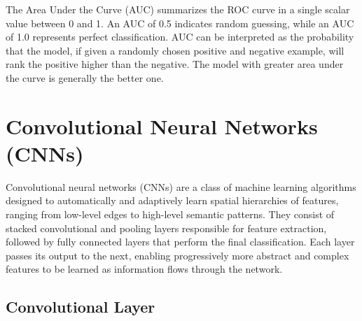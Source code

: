 \documentclass{pracalicmgr}
\begin{document}
The Area Under the Curve (AUC) summarizes the ROC curve in a single scalar value between 0 and 1. An AUC of 0.5 indicates random guessing, while an AUC of 1.0 represents perfect classification. AUC can be interpreted as the probability that the model, if given a randomly chosen positive and negative example, will rank the positive higher than the negative. The model with greater area under the curve is generally the better one.

\chapter{Convolutional Neural Networks (CNNs)}


Convolutional neural networks (CNNs) are a class of machine learning algorithms designed to automatically and adaptively learn spatial hierarchies of features, ranging from low-level edges to high-level semantic patterns. They consist of stacked convolutional and pooling layers responsible for feature extraction, followed by fully connected layers that perform the final classification. Each layer passes its output to the next, enabling progressively more abstract and complex features to be learned as information flows through the network.

\section{Convolutional Layer}
\end{document}
